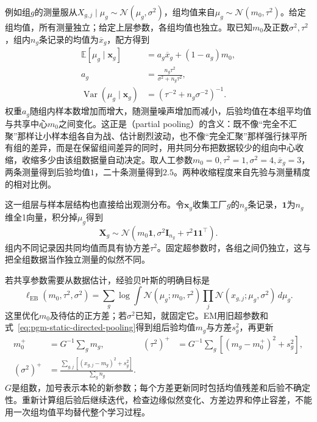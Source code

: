 例如组$g$的测量服从$X_{g,j}\mid\mu_g\sim\mathcal N(\mu_g,\sigma^2)$，组均值来自$\mu_g\sim\mathcal N(m_0,\tau^2)$。给定组均值，所有测量独立；给定上层参数，各组均值也独立。取已知$m_0$及正数$\sigma^2,\tau^2$，组内$n_g$条记录的均值为$\overline x_g$，配方得到
\begin{equation}
  \label{eq:pgm-static-directed-pooling}
  \begin{aligned}
    \mathbb{E}[\mu_g\mid\bm{x}_g]
      &=a_g\overline x_g+(1-a_g)m_0,\\
    a_g&=\frac{n_g\tau^2}{\sigma^2+n_g\tau^2},\\
    \operatorname{Var}(\mu_g\mid\bm{x}_g)
      &=\left(\tau^{-2}+n_g\sigma^{-2}\right)^{-1}.
  \end{aligned}
\end{equation}
权重$a_g$随组内样本数增加而增大，随测量噪声增加而减小，后验均值在本组平均值与共享中心$m_0$之间变化。这正是（partial pooling）的含义：既不像“完全不汇聚”那样让小样本组各自为战、估计剧烈波动，也不像“完全汇聚”那样强行抹平所有组的差异，而是在保留组间差异的同时，用共同分布把数据较少的组向中心收缩，收缩多少由该组数据量自动决定。取人工参数$m_0=0,\tau^2=1,\sigma^2=4,\overline x_g=3$，两条测量得到后验均值$1$，二十条测量得到$2.5$。两种收缩程度来自先验与测量精度的相对比例。

这一组层与样本层结构也直接给出观测分布。令$\bm x_g$收集工厂$g$的$n_g$条记录，$\bm1$为$n_g$维全1向量，积分掉$\mu_g$得到
\[
 \bm X_g\sim\mathcal N(m_0\bm1,
       \sigma^2\bm I_{n_g}+\tau^2\bm1\bm1^\top).
\]
组内不同记录因共同均值而具有协方差$\tau^2$。固定超参数时，各组之间仍独立，这与把全组数据当作独立测量的似然不同。

若共享参数需要从数据估计，经验贝叶斯的明确目标是
\begin{equation}
 \ell_{\mathrm{EB}}(m_0,\tau^2,\sigma^2)
 =\sum_g\log\int\mathcal N(\mu_g;m_0,\tau^2)
                \prod_j\mathcal N(x_{g,j};\mu_g,\sigma^2)\,d\mu_g.
 \label{eq:pgm-static-directed-pooling-objective}
\end{equation}
这里优化$m_0$及待估的正方差；若$\sigma^2$已知，就固定它。EM用旧超参数和式~\eqref{eq:pgm-static-directed-pooling}得到组后验均值$m_g$与方差$s_g^2$，再更新
\[
 \begin{aligned}
 m_0^+&=G^{-1}\sum_gm_g, &
 (\tau^2)^+&=G^{-1}\sum_g[(m_g-m_0^+)^2+s_g^2],\\
 (\sigma^2)^+&=\frac{\sum_{g,j}[(x_{g,j}-m_g)^2+s_g^2]}{\sum_g n_g}.
 \end{aligned}
\]
$G$是组数，加号表示本轮的新参数；每个方差更新同时包括均值残差和后验不确定性。重新计算组后验后继续迭代，检查边缘似然变化、方差边界和停止容差，不能用一次组均值平均替代整个学习过程。


